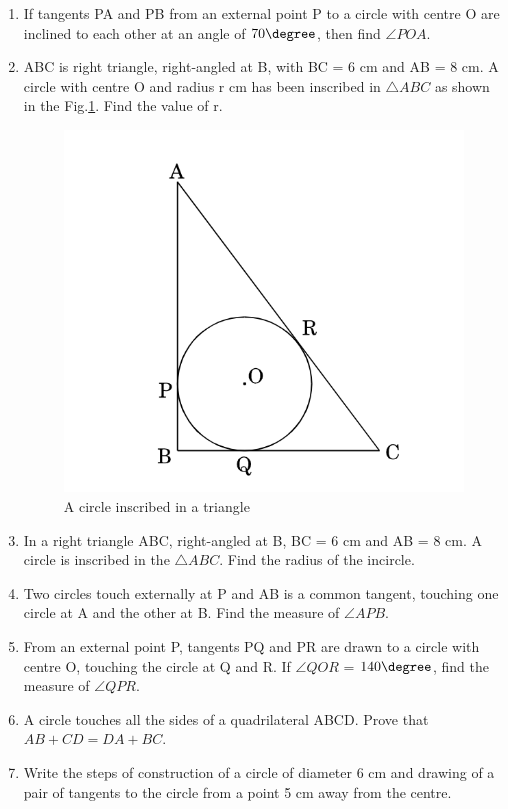 \begin{enumerate}
        \item If tangents PA and PB from an external point P to a circle with centre O are inclined to each other at an angle of $70\degree$, then find $\angle POA$. 

        \item ABC is right triangle, right-angled at B, with BC = 6 cm and AB = 8 cm. A circle with centre O and radius r cm has been inscribed in $\triangle ABC$ as shown in the Fig.\ref{fig}. Find the value of r. 
  
        \begin{figure}[h]
        \centering
        \includegraphics[width=\columnwidth]{figs/3.jpg}
        \caption{A circle inscribed in a triangle}
        \label{fig}
        \end{figure}
        
        \item In a right triangle ABC, right-angled at B, BC = 6 cm and AB = 8 cm. A circle is inscribed in the $\triangle ABC$. Find the radius of the incircle. 
            
        \item Two circles touch externally at P and AB is a common tangent, touching one circle at A and the other at B. Find the measure of $\angle APB$.

        \item From an external point P, tangents PQ and PR are drawn to a circle with centre O, touching the circle at Q and R. If $\angle QOR$ = $140\degree$, find the measure of $\angle QPR$. 

        \item A circle touches all the sides of a quadrilateral ABCD. Prove that $AB + CD = DA + BC$.

        \item Write the steps of construction of a circle of diameter 6 cm and drawing of a pair of tangents to the circle from a point 5 cm away from the centre. 
            		
	\end{enumerate}	
